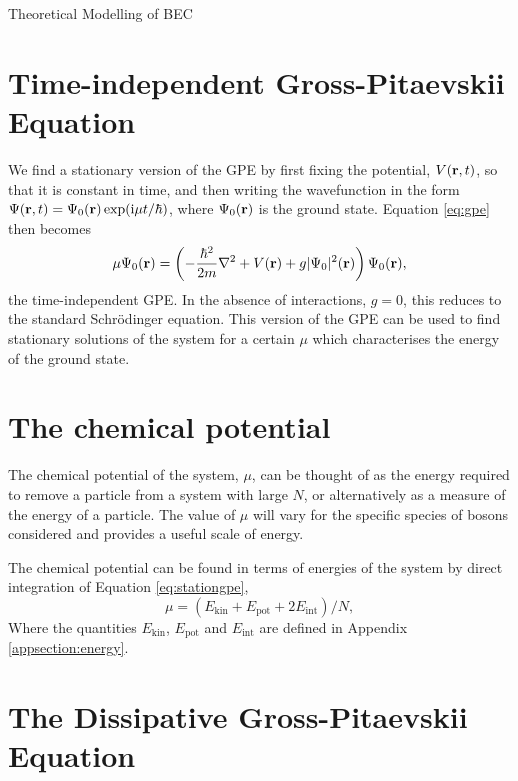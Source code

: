 \begin{chapter}{\label{cha:theoretical_model}Theoretical Modelling of BEC}
\section{\label{section:gpestationary} Time-independent Gross-Pitaevskii Equation}
 We find a stationary version of the GPE by first fixing the potential, $V({\bf r},t)$, so that it is constant in time, and then writing the wavefunction in the form $\Psi({\bf r},t) = \Psi_0({\bf r}) \exp (\mathrm{i}\mu t / \hbar)$, where $\Psi_0({\bf r})$ is the ground state. Equation \ref{eq:gpe} then becomes
	\begin{equation}\label{eq:stationgpe}
		\mu\Psi_0({\bf r}) = \left( -\frac{\hbar^2}{2m}\nabla^2 + V({\bf r}) + g|\Psi_0|^2({\bf r})  \right) \Psi_0({\bf r}),
	\end{equation}
	the time-independent GPE. In the absence of interactions, $g=0$, this reduces to the standard Schr\"odinger equation. This version of the GPE can be used to find stationary solutions of the system for a certain $\mu$ which characterises the energy of the ground state.
	
\section{\label{section:mu} The chemical potential}
The chemical potential of the system, $\mu$, can be thought of as the energy required to remove a particle from a system with large $N$, or alternatively as a measure of the energy of a particle. The value of $\mu$ will vary for the specific species of bosons considered and provides a useful scale of energy.

The chemical potential can be found in terms of energies of the system by direct integration of Equation \ref{eq:stationgpe},
	\begin{equation}\label{eq:chempot}
		\mu = \left ( E_{\mathrm{kin}} + E_{\mathrm{pot}} + 2E_{\mathrm{int}} \right ) / N,
	\end{equation}
	Where the quantities $E_{\mathrm{kin}}$, $E_{\mathrm{pot}}$ and $E_{\mathrm{int}}$ are defined in Appendix \ref{appsection:energy}.


\section{\label{section:dgpe} The Dissipative Gross-Pitaevskii Equation}


\end{chapter}
